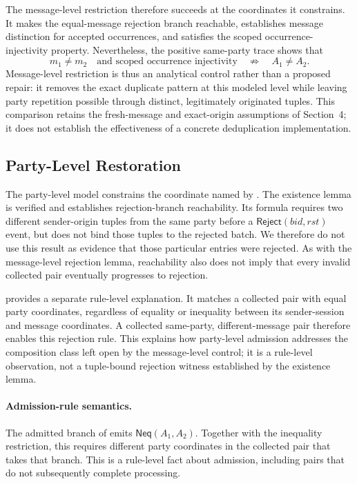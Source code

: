 The message-level restriction therefore succeeds at the coordinates it
constrains. It makes the equal-message rejection branch reachable, establishes
message distinction for accepted occurrences, and satisfies the scoped
occurrence-injectivity property. Nevertheless, the positive same-party trace
shows that
\begin{equation}
  m_1\neq m_2
  \quad\text{and scoped occurrence injectivity}
  \quad\not\Longrightarrow\quad
  A_1\neq A_2.
  \label{eq:message-not-party}
\end{equation}
Message-level restriction is thus an analytical control rather than a proposed
repair: it removes the exact duplicate pattern at this modeled level while
leaving party repetition possible through distinct, legitimately originated
tuples. This comparison retains the fresh-message and exact-origin assumptions
of Section~4; it does not establish the effectiveness of a concrete
deduplication implementation.

\subsection{Party-Level Restoration}

The party-level model constrains the coordinate named by \distinctparty. The
existence lemma  is verified and establishes
rejection-branch reachability. Its formula requires two different sender-origin
tuples from the same party before a \(\mathsf{Reject}(\mathit{bid},\mathit{rst})\)
event, but does not bind those tuples to the rejected batch. We therefore do
not use this result as evidence that those particular entries were rejected.
As with the message-level rejection lemma, reachability also does not imply
that every invalid collected pair eventually progresses to rejection.

 provides a separate rule-level explanation.
It matches a collected pair with equal party coordinates, regardless of
equality or inequality between its
sender-session and message coordinates. A collected same-party,
different-message pair therefore enables this rejection rule. This explains
how party-level admission addresses the composition class left open by the
message-level control; it is a rule-level observation, not a tuple-bound
rejection witness established by the existence lemma.

\paragraph{Admission-rule semantics.}
The admitted branch of  emits
\(\mathsf{Neq}(A_1,A_2)\). Together with the inequality restriction, this
requires different party coordinates in the collected pair that takes that
branch. This is a rule-level fact about admission, including pairs that do
not subsequently complete processing.

